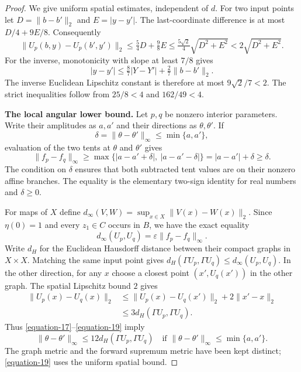 \documentclass[11pt,a4paper]{article}
\theoremstyle{definition}
\begin{document}
\begin{proof}
We give uniform spatial estimates, independent of $d$.
For two input points let $D=\|b-b'\|_2$ and $E=|y-y'|$.
The last-coordinate difference is at most
$D/4+9E/8$. Consequently
\begin{equation}
 \|U_p(b,y)-U_p(b',y')\|_2
 \le \tfrac54D+\tfrac98E
 \le\tfrac{5\sqrt2}{4}\sqrt{D^2+E^2}<2\sqrt{D^2+E^2}.
 \label{equation-16}
\end{equation}
For the inverse, monotonicity with slope at least $7/8$ gives
\[
 |y-y'|\le\tfrac87|Y-Y'|+\tfrac27\|b-b'\|_2.
\]
The inverse Euclidean Lipschitz constant is therefore at most
$9\sqrt2/7<2$. The strict inequalities follow from
$25/8<4$ and $162/49<4$.

\textbf{The local angular lower bound.}
Let $p,q$ be nonzero interior parameters. Write their amplitudes as
$a,a'$ and their directions as $\theta,\theta'$. If
\[
             \delta=\|\theta-\theta'\|_\infty
                            \le\min\{a,a'\},
\]
evaluation of the two tents at $\theta$ and $\theta'$ gives
\begin{equation}
 \|f_p-f_q\|_\infty
       \ge\max\{|a-a'+\delta|,\ |a-a'-\delta|\}
       =|a-a'|+\delta\ge\delta.
 \label{equation-17}
\end{equation}
The condition on $\delta$ ensures that both subtracted tent values
are on their nonzero affine branches. The equality is the elementary
two-sign identity for real numbers and $\delta\ge0$.

For maps of $X$ define
$d_\infty(V,W)=\sup_{x\in X}\|V(x)-W(x)\|_2$.
Since $\eta(0)=1$ and every $z_1\in C$ occurs in $B$, we have
the exact equality
\begin{equation}
           d_\infty(U_p,U_q)
                     =\varepsilon\|f_p-f_q\|_\infty.
 \label{equation-18}
\end{equation}
Write $d_H$ for the Euclidean Hausdorff distance between their
compact graphs in $X\times X$. Matching the same input point gives
$d_H(\Gamma U_p,\Gamma U_q)\le d_\infty(U_p,U_q)$.
In the other direction, for any $x$ choose a closest point
$(x',U_q(x'))$ in the other graph. The spatial Lipschitz bound $2$
gives
\begin{equation}
 \begin{split}
 \|U_p(x)-U_q(x)\|_2
 &\le\|U_p(x)-U_q(x')\|_2+
                         2\|x'-x\|_2\\
 &\le3d_H(\Gamma U_p,\Gamma U_q).
 \end{split}
 \label{equation-19}
\end{equation}
Thus \eqref{equation-17}--\eqref{equation-19} imply
\begin{equation}
 \|\theta-\theta'\|_\infty
       \le12d_H(\Gamma U_p,\Gamma U_q)
 \quad\text{if }\|\theta-\theta'\|_\infty\le\min\{a,a'\}.
 \label{equation-20}
\end{equation}
The graph metric and the forward supremum metric have been kept
distinct; \eqref{equation-19} uses the uniform spatial bound.


\end{proof}
\end{document}
